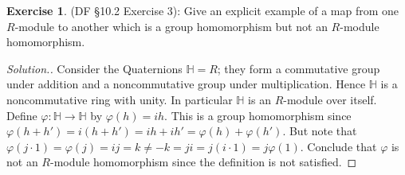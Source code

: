 \documentclass[8pt]{amsart}
\makeatletter
\theoremstyle{plain}%
\theoremstyle{definition}
\newtheorem*{exercise}{Exercise}%
\theoremstyle{remark}
\numberwithin{equation}{section}
\newenvironment{solution}
               {\let\oldqedsymbol=\qedsymbol%
                \def\@addpunct##1{}%
                \renewcommand{\qedsymbol}{$\blacktriangleleft$}%
                \begin{proof}[\itshape Solution.]}%
               {\end{proof}%
                \renewcommand{\qedsymbol}{\oldqedsymbol}}
\makeatother
\begin{document}
\begin{exercise}
(DF \S 10.2 Exercise 3): Give an explicit example of a map from one $R$-module to another which is a group homomorphism but not an $R$-module homomorphism.
	\begin{solution}
		Consider the Quaternions $\mathbb H = R$; they form a commutative group under addition and a noncommutative group under multiplication. Hence $\mathbb H$ is a noncommutative ring with unity. In particular $\mathbb H$ is an $R$-module over itself. Define $\varphi : \mathbb H \to \mathbb H$ by $\varphi(h) = ih$. This is a group homomorphism since $\varphi(h + h') = i(h + h') = ih + ih' = \varphi(h) + \varphi(h')$. But note that $\varphi(j \cdot 1) = \varphi(j) = ij = k \neq -k = ji = j(i \cdot 1) = j \varphi(1)$. Conclude that $\varphi$ is not an $R$-module homomorphism since the definition is not satisfied.
	\end{solution}
\end{exercise}
\end{document}
